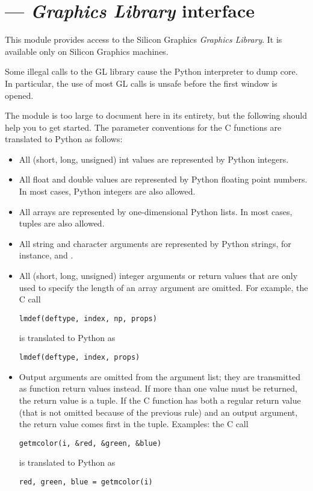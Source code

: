 \section{ ---
         \emph{Graphics Library} interface}



This module provides access to the Silicon Graphics
\emph{Graphics Library}.
It is available only on Silicon Graphics machines.

Some illegal calls to the GL library cause the Python interpreter to dump
core.
In particular, the use of most GL calls is unsafe before the first
window is opened.

The module is too large to document here in its entirety, but the
following should help you to get started.
The parameter conventions for the C functions are translated to Python as
follows:

\begin{itemize}
\item
All (short, long, unsigned) int values are represented by Python
integers.
\item
All float and double values are represented by Python floating point
numbers.
In most cases, Python integers are also allowed.
\item
All arrays are represented by one-dimensional Python lists.
In most cases, tuples are also allowed.
\item
\begin{sloppypar}
All string and character arguments are represented by Python strings,
for instance,
and
.
\end{sloppypar}
\item
All (short, long, unsigned) integer arguments or return values that are
only used to specify the length of an array argument are omitted.
For example, the C call

\begin{verbatim}
lmdef(deftype, index, np, props)
\end{verbatim}
%
is translated to Python as

\begin{verbatim}
lmdef(deftype, index, props)
\end{verbatim}
%
\item
Output arguments are omitted from the argument list; they are
transmitted as function return values instead.
If more than one value must be returned, the return value is a tuple.
If the C function has both a regular return value (that is not omitted
because of the previous rule) and an output argument, the return value
comes first in the tuple.
Examples: the C call

\begin{verbatim}
getmcolor(i, &red, &green, &blue)
\end{verbatim}
%
is translated to Python as

\begin{verbatim}
red, green, blue = getmcolor(i)
\end{verbatim}
%
\end{itemize}

